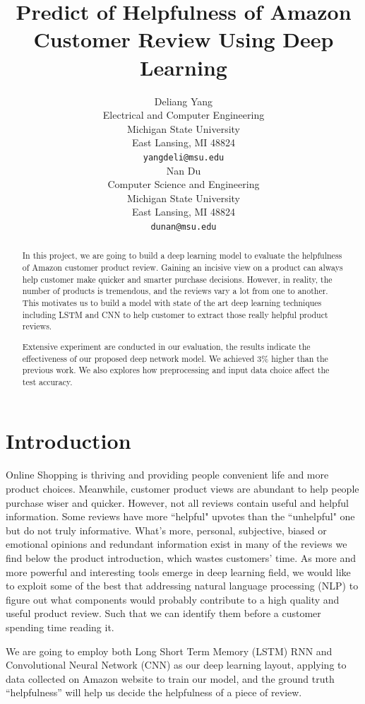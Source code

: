 \documentclass[11pt]{article}
\title{Predict of Helpfulness of Amazon Customer Review Using Deep Learning}
\author{Deliang Yang \\
  Electrical and Computer Engineering \\
  Michigan State University \\
  East Lansing, MI 48824 \\
  {\tt yangdeli@msu.edu} \\\And
  Nan Du \\
  Computer Science and Engineering \\
  Michigan State University \\
  East Lansing, MI 48824 \\
  {\tt dunan@msu.edu} \\}
\date{}
\begin{document}
\maketitle
\begin{abstract}
In this project, we are going to build a deep learning model to evaluate the helpfulness of Amazon customer product review. Gaining an incisive view on a product can always help customer make quicker and smarter purchase decisions. However, in reality, the number of products is tremendous, and the reviews vary a lot from one to another. This motivates us to build a model with state of the art deep learning techniques including LSTM and CNN to help customer to extract those really helpful product reviews. 
  
Extensive experiment are conducted in our evaluation, the results indicate the effectiveness of our proposed deep network model. We achieved 3\% higher than the previous work. We also explores how preprocessing and input data choice affect the test accuracy.
  
\end{abstract}

\section{Introduction}

Online Shopping is thriving and providing people convenient life and more product choices. Meanwhile, customer product views are abundant to help people purchase wiser and quicker. However, not all reviews contain useful and helpful information. Some reviews have more ``helpful" upvotes than the ``unhelpful" one but do not truly informative. What's more, personal, subjective, biased or emotional opinions and redundant information exist in many of the reviews we find below the product introduction, which wastes customers' time. As more and more powerful and interesting tools emerge in deep learning field, we would like to exploit some of the best that addressing natural language processing (NLP) to figure out what components would probably contribute to a high quality and useful product review. Such that we can identify them before a customer spending time reading it. 



We are going to employ both Long Short Term Memory (LSTM) RNN and Convolutional Neural Network (CNN) as our deep learning layout, applying to data collected on Amazon website to train our model, and the ground truth ``helpfulness'' will help us decide the helpfulness of a piece of review. 
\end{document}
